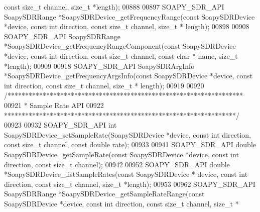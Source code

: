 \begin{DoxyCode}
{      const} \textcolor{keywordtype}{size\_t} channel, \textcolor{keywordtype}{size\_t} *length);
00888 
00897 SOAPY_SDR_API SoapySDRRange *SoapySDRDevice_getFrequencyRange(\textcolor{keyword}{const} 
      SoapySDRDevice *device, \textcolor{keyword}{const} \textcolor{keywordtype}{int} direction, \textcolor{keyword}{const} \textcolor{keywordtype}{size\_t} channel, \textcolor{keywordtype}{size\_t} *
      length);
00898 
00908 SOAPY_SDR_API SoapySDRRange *SoapySDRDevice_getFrequencyRangeComponent(\textcolor{keyword}{const} 
      SoapySDRDevice *device, \textcolor{keyword}{const} \textcolor{keywordtype}{int} direction, \textcolor{keyword}{const} \textcolor{keywordtype}{size\_t} channel, \textcolor{keyword}{const} \textcolor{keywordtype}{char} *
      name, \textcolor{keywordtype}{size\_t} *length);
00909 
00918 SOAPY_SDR_API SoapySDRArgInfo *SoapySDRDevice_getFrequencyArgsInfo(\textcolor{keyword}{const} 
      SoapySDRDevice *device, \textcolor{keyword}{const} \textcolor{keywordtype}{int} direction, \textcolor{keyword}{const} \textcolor{keywordtype}{size\_t} channel, \textcolor{keywordtype}{size\_t} *
      length);
00919 
00920 \textcolor{comment}{/*******************************************************************}
00921 \textcolor{comment}{ * Sample Rate API}
00922 \textcolor{comment}{ ******************************************************************/}
00923 
00932 SOAPY_SDR_API \textcolor{keywordtype}{int} SoapySDRDevice_setSampleRate(SoapySDRDevice *device, \textcolor{keyword}{const} \textcolor{keywordtype}{int} direction, \textcolor{keyword}{const} \textcolor{keywordtype}{size\_t} 
      channel, \textcolor{keyword}{const} \textcolor{keywordtype}{double} rate);
00933 
00941 SOAPY_SDR_API \textcolor{keywordtype}{double} SoapySDRDevice_getSampleRate(\textcolor{keyword}{const} SoapySDRDevice *device, \textcolor{keyword}{const} \textcolor{keywordtype}{int} direction, \textcolor{keyword}{const} \textcolor{keywordtype}{
      size\_t} channel);
00942 
00952 SOAPY_SDR_API \textcolor{keywordtype}{double} *SoapySDRDevice_listSampleRates(\textcolor{keyword}{const} SoapySDRDevice *
      device, \textcolor{keyword}{const} \textcolor{keywordtype}{int} direction, \textcolor{keyword}{const} \textcolor{keywordtype}{size\_t} channel, \textcolor{keywordtype}{size\_t} *length);
00953 
00962 SOAPY_SDR_API SoapySDRRange *SoapySDRDevice_getSampleRateRange(\textcolor{keyword}{const} 
      SoapySDRDevice *device, \textcolor{keyword}{const} \textcolor{keywordtype}{int} direction, \textcolor{keyword}{const} \textcolor{keywordtype}{size\_t} channel, \textcolor{keywordtype}{size\_t} *

\end{DoxyCode}
